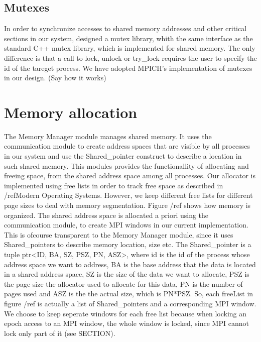 \subsection{Mutexes}
In order to synchronize accesses to shared memory addresses and other critical sections in our system, designed
a mutex library, whith the same interface as the standard C++ mutex library, which is implemented
for shared memory.  The only difference is that a call to lock, unlock or try\_lock requires the user to specify
the id of the tareget process. We have adopted MPICH's implementation of mutexes in our design.  (Say how it 
works)      


\section{Memory allocation}
The Memory Manager module manages shared memory. It uses the communication module to create address spaces that
are visible by all processes in our system and use the Shared\_pointer construct to describe a location in such
shared memory.  This modules provides the functionallity of allocating and freeing space, from the shared address 
space among all processes.  Our allocator is implemented using free lists in order to track free space as 
described in /refModern Operating Systems.  However, we keep different free lists for different page sizes to deal
with memory segmentation.  Figure /ref shows how memory is organized.  The shared address space is allocated a priori
using the communication module, to create MPI windows in our current implementation.  This is ofcourse transparent to
the Memory Manager module, since it uses Shared\_pointers to describe memory location, size etc.  
The Shared\_pointer is a tuple  ptr<ID, BA, SZ, PSZ, PN, ASZ>, where id is the id of the process
whose address space we want to address, BA is the base address that the data is located in a shared address space,
SZ is the size of the data we want to allocate, PSZ is the page size the allocator used to allocate for this data,
PN is the number of pages used and ASZ is the the actual size, which is PN*PSZ.   
So, each freeList in figure /ref is actually a list of Shared\_pointers and a corresponding MPI window.  We choose
to keep seperate windows for each free list because when locking an epoch access to an MPI window, the whole 
window is locked, since MPI cannot lock only part of it (see SECTION).  


